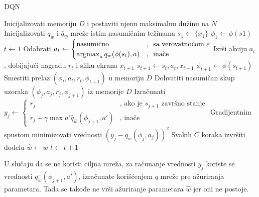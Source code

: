 \begin{myalgorithm}
\caption{DQN}\label{alg:dqn}
\begin{algorithmic}[0]
\Require
Inicijalizovati memoriju $D$ i postaviti njenu maksimalnu dužinu na $N$ \\ 
Inicijalizovati $q_w$ i $\hat{q}_{\hat{w}}$ mreže istim nasumičnim težinama 
	\State $s_1 \gets \{x_1\}$
	\State $\phi_1 \gets \phi(s1)$
	\State $t \gets 1$
	\Repeat
		\State Odabrati $a_t \gets
		\begin{cases} \text{nasumično}&\text{, ~sa verovatnoćom~} \varepsilon  \\
                      \operatorname*{\arg\!\max}_a q_w(\phi(s_t), a) &\text{, ~inače}
        \end{cases}$
		\State Izrši akciju $a_t$, dobijajući nagradu $r_t$ i sliku ekrana $x_{t+1}$
		\State $s_{t+1} \gets s_t, a_t, x_{t+1}$		
		\State $\phi_{t+1} \gets \phi(s_{t+1})$
		\State Smestiti prelaz $(\phi_t, a_t, r_t, \phi_{t+1})$ u memoriju $D$
		\State Dohvatiti nasumičan skup uzoraka $(\phi_j, a_j, r_j, \phi_{j+1})$ iz memorije $D$
		\State Izračunati 
		$y_j \gets \begin{cases} r_j & \text{, ako je } s_{j+1} \text{ završno stanje}  \\
                      r_j + \gamma \max{a'} \hat{q}_{\hat{w}}(\phi_{j+1}, a') & \text{, inače}
        \end{cases}$
        \State Gradijentnim spustom minimizovati vrednosti $(y_j - q_w(\phi_j, a_j))^2$
        \State Svakih $C$ koraka izvršiti dodelu $\hat{w} \gets w$
        \State $t \gets t+1$
\EndFor
\end{algorithmic}
\end{myalgorithm}

U slučaju da se ne koristi ciljna mreža, za računanje vrednosti $y_j$ koriste se vrednosti $q_w^-(\phi_{j+1}, a')$, izračunate korišćenjem $q$ mreže pre ažuriranja parametara. Tada se takođe ne vrši ažuriranje parametara $\hat{w}$ jer oni ne postoje.



